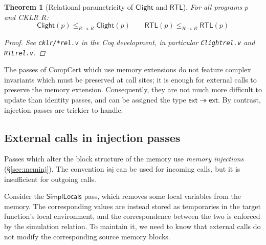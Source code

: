 \documentclass[11pt,oneside]{book}
\newtheorem{theorem}{Theorem}[chapter]
\theoremstyle{definition}
\newcommand{\kw}[1]{\ensuremath{ \mathsf{#1} }}
\begin{document}
\begin{theorem}[Relational parametricity of $\kw{Clight}$ and $\kw{RTL}$] %
\label{thm:param}
For all programs $p$ and CKLR $R$:
\[
      \kw{Clight}(p)
        \le_{R \twoheadrightarrow R}
      \kw{Clight}(p)
      \qquad
      \kw{RTL}(p)
        \le_{R \twoheadrightarrow R}
      \kw{RTL}(p)
\]
\begin{proof}
See \texttt{cklr/*rel.v} in the Coq development,
in particular \texttt{Clightrel.v} and \texttt{RTLrel.v}.
\end{proof}
\end{theorem}

The passes of CompCert which use memory extensions
do not feature complex invariants
which must be preserved at call sites;
it is enough for external calls to preserve
the memory extension.
Consequently,
they are not much more difficult to update
than identity passes,
and can be assigned the type $\kw{ext} \twoheadrightarrow \kw{ext}$.
By contrast,
injection passes are trickier to handle.


\subsection{External calls in injection passes} \label{sec:injp} %

Passes which alter the block structure of the memory
use \emph{memory injections} (\S\ref{sec:meminj}).
The convention \kw{inj} can be used for incoming calls,
but it is insufficient for outgoing calls.

Consider the \kw{SimplLocals} pass,
which removes some local variables %
from the memory.
The corresponding values are instead stored
as temporaries in the target function's local environment,
and the correspondence between the two
is enforced by the simulation relation.
To maintain it,
we need to know that
external calls do not modify
the corresponding source memory blocks.
\end{document}
